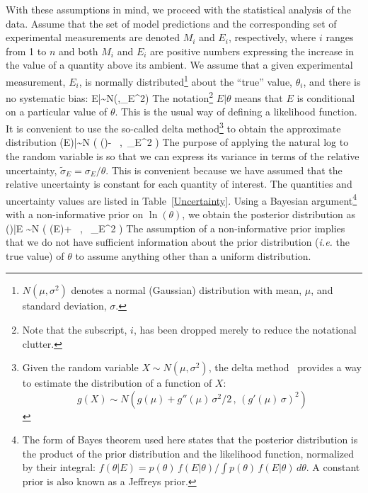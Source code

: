 With these assumptions in mind, we proceed with the statistical analysis of the data.
Assume that the set of model predictions and the corresponding set of experimental measurements are denoted
$M_i$ and $E_i$, respectively, where $i$ ranges from 1 to $n$ and both $M_i$ and $E_i$ are positive numbers
expressing the increase in the value of a quantity above its ambient.
We assume that a given experimental measurement, $E_i$, is normally
distributed\footnote{$N(\mu,\sigma^2)$ denotes a normal (Gaussian) distribution
with mean, $\mu$, and standard deviation, $\sigma$.} about the ``true'' value, $\theta_i$, and there is no systematic bias:
\be E|\theta \sim N(\theta,\sigma_E^2) \label{expunc} \ee
The notation\footnote{Note that the subscript, $i$, has been dropped merely to reduce the notational clutter.}
$E|\theta$ means that $E$ is conditional on a particular value of $\theta$.
This is the usual way of defining a likelihood function.
It is convenient to use the so-called delta method\footnote{Given the random variable $X \sim N(\mu,\sigma^2)$, the
delta method~\cite{Oehlert:1992} provides a way to estimate the distribution of a function of $X$:
$$g(X) \sim N \left( g(\mu) + g''(\mu) \, \sigma^2/2 \, , \, (g'(\mu) \, \sigma)^2\right)$$} to obtain the approximate distribution
\be \ln(E)|\theta \sim N \left( \ln(\theta)-  \, , \,\widetilde{\sigma}_E^2 \right) \label{eeq} \ee
The purpose of applying the natural log to the random variable is so that we can express its variance in terms of the
relative uncertainty, $\widetilde{\sigma}_E=\sigma_E/\theta$. This is convenient because we have assumed that the relative
uncertainty is constant for each quantity of interest. The quantities and uncertainty values are listed in Table~\ref{Uncertainty}.
Using a Bayesian argument\footnote{The form of Bayes theorem used here states that the posterior distribution is the product of
the prior distribution and the likelihood function, normalized by their integral:
$f(\theta|E)= p(\theta) \, f(E|\theta)/\int p(\theta) \, f(E|\theta) \, d\theta$.
A constant prior is also known as a Jeffreys prior.}
with a non-informative prior on $\ln(\theta)$, we obtain the posterior distribution as
\be \ln(\theta)|E \sim N \left( \ln(E)+  \, , \, \widetilde{\sigma}_E^2 \right) \label{thetaeq} \ee
The assumption of a non-informative prior implies that we do not have sufficient information about the
prior distribution ({\em i.e.} the true value) of
$\theta$ to assume anything other than a uniform distribution.

